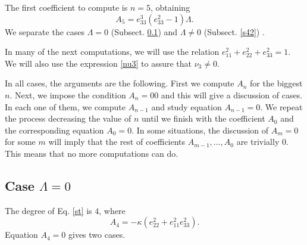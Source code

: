 \documentclass[12pt,a4paper,reqno]{amsart}
\begin{document}
The first coefficient to compute is  $n=5$, obtaining
$$A_5=e_{33}^3(e_{33}^2-1)\Lambda.$$
We separate the cases $\Lambda=0$ (Subsect. \ref{s41}) and $\Lambda\not=0$ (Subsect. \ref{s42}) .

In many of the next computations, we will use the relation $e_{11}^2+e_{22}^2+e_{33}^2=1$. We will also use the expression \eqref{nu3} to assure that $\nu_3\not=0$. 

In all cases, the arguments are the following. First we compute $A_n$ for the biggest $n$. Next, we impose the condition $A_n=00$ and this will give a discussion of cases. In each one of them, we compute $A_{n-1}$ and study equation $A_{n-1}=0$. We repeat the process decreasing the value of $n$  until we finish with the coefficient $A_0$ and the corresponding equation $A_0=0$. In some situations, the discussion of $A_m=0$ for some $m$ will imply that the rest of coefficients $A_{m-1},\ldots, A_0$ are trivially $0$. This means that no more computations can do.


\subsection{Case $\Lambda=0$}\label{s41}

The degree of Eq. \eqref{st} is $4$, where
$$A_4=-\kappa(e_{22}^2+e_{11}^2e_{33}^2).$$
Equation $A_4=0$ gives two cases.
\end{document}
